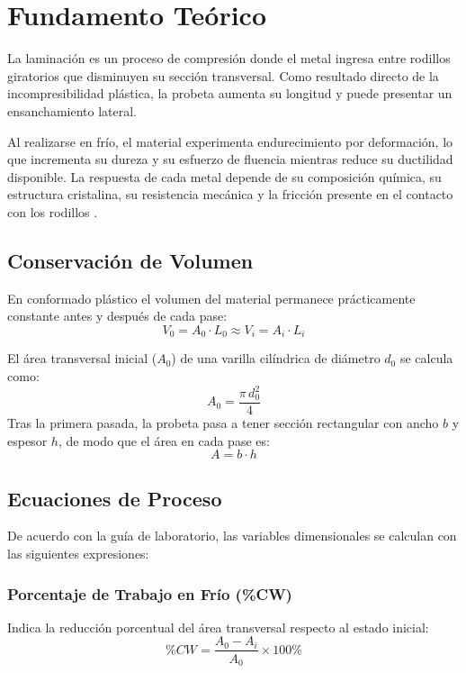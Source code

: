 \documentclass[journal]{IEEEtran}
\begin{document}
\section{Fundamento Teórico}
La laminación es un proceso de compresión donde el metal ingresa entre rodillos giratorios que disminuyen su sección transversal. Como resultado directo de la incompresibilidad plástica, la probeta aumenta su longitud y puede presentar un ensanchamiento lateral.

Al realizarse en frío, el material experimenta endurecimiento por deformación, lo que incrementa su dureza y su esfuerzo de fluencia mientras reduce su ductilidad disponible. La respuesta de cada metal depende de su composición química, su estructura cristalina, su resistencia mecánica y la fricción presente en el contacto con los rodillos \cite{kalpakjian2014}.

\subsection{Conservación de Volumen}
En conformado plástico el volumen del material permanece prácticamente constante antes y después de cada pase:
\begin{equation}
V_0 = A_0 \cdot L_0 \approx V_i = A_i \cdot L_i
\label{eq:volumen}
\end{equation}

El área transversal inicial ($A_0$) de una varilla cilíndrica de diámetro $d_0$ se calcula como:
\begin{equation}
A_0 = \frac{\pi \, d_0^2}{4}
\label{eq:area_cilindro}
\end{equation}
Tras la primera pasada, la probeta pasa a tener sección rectangular con ancho $b$ y espesor $h$, de modo que el área en cada pase es:
\begin{equation}
A = b \cdot h
\label{eq:area_rectangulo}
\end{equation}

\subsection{Ecuaciones de Proceso}
De acuerdo con la guía de laboratorio, las variables dimensionales se calculan con las siguientes expresiones:

\subsubsection{Porcentaje de Trabajo en Frío (\%CW)}
Indica la reducción porcentual del área transversal respecto al estado inicial:
\begin{equation}
\%CW = \frac{A_0 - A_i}{A_0} \times 100\%
\label{eq:cw}
\end{equation}
\end{document}

